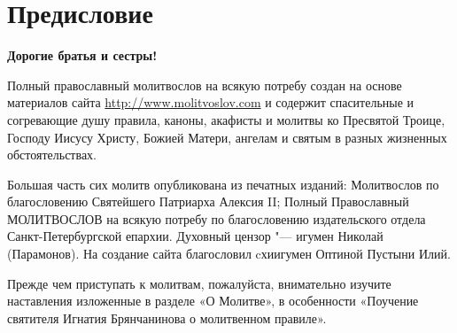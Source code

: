 \chapter*{Предисловие}

\renewcommand\myid{announce}

\begin{identity}

\textbf{Дорогие братья и сестры!}

Полный православный молитвослов на всякую потребу создан на основе материалов сайта \url{http://www.molitvoslov.com} и содержит спасительные и согревающие душу правила, каноны, акафисты и молитвы ко Пресвятой Троице, Господу Иисусу Христу, Божией Матери, ангелам и святым в разных жизненных обстоятельствах.

Большая часть сих молитв опубликована из печатных изданий: Молитвослов по благословению Святейшего Патриарха Алексия II; Полный Православный МОЛИТВОСЛОВ на всякую потребу по благословению издательского отдела Санкт-Петербургской епархии. Духовный цензор "--- игумен Николай (Парамонов). На создание сайта благословил cхиигумен Оптиной Пустыни Илий.

Прежде чем приступать к молитвам, пожалуйста, внимательно изучите наставления изложенные в разделе «О Молитве», в особенности «Поучение святителя Игнатия Брянчанинова о молитвенном правиле».

\end{identity}

